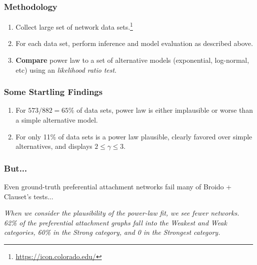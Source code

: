 \documentclass{beamer}
\begin{document}
		
		\begin{frame}\frametitle{Methodology}
		  	\begin{enumerate}
		  		\item Collect large set of network data sets.\footnote{\url{https://icon.colorado.edu/}}
		  		\item For each data set, perform inference and model evaluation as described above. 
		  		\item \textbf{Compare} power law to a set of alternative models (exponential, log-normal, etc) using an \emph{likelihood ratio test}.  
		  	\end{enumerate}
		\end{frame}
	
		
		\begin{frame}\frametitle{Some Startling Findings}
			\begin{enumerate}
				\item For $573 / 882 = 65\%$ of data sets, power law is either implausible or worse than a simple alternative model. 
				\item For only 11\% of data sets is a power law plausible, clearly favored over simple alternatives, and displays $2 \leq \gamma \leq 3$.
			\end{enumerate}
		\end{frame}
	
		
		\begin{frame}\frametitle{But...}
			Even ground-truth preferential attachment networks fail many of Broido + Clauset's tests...

			\emph{When we consider the plausibility of the power-law fit, we see fewer networks. 62\% of the preferential attachment graphs fall into the Weakest and Weak categories, 60\% in the Strong category, and 0 in the Strongest category.}
		\end{frame}
	
\end{document}
